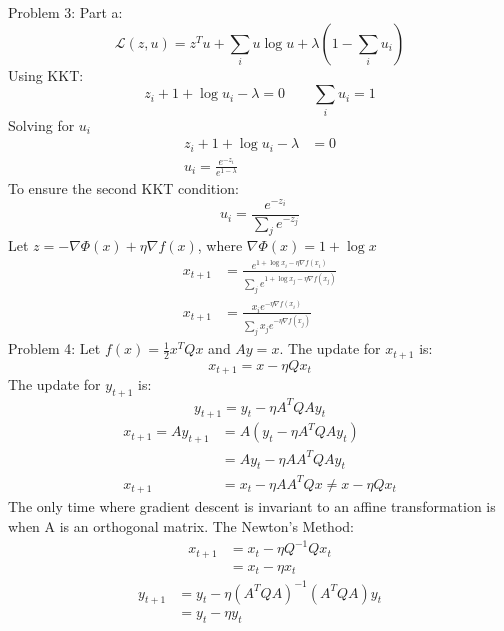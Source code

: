 \documentclass{article}
\begin{document}
\noindent
{\large Problem 3:}
\newline
Part a:
\begin{equation*}
	\mathcal{L}(z, u) = z^Tu + \sum_i {u \log u} + \lambda(1 - \sum_i u_i)
\end{equation*}
Using KKT:
\begin{equation*}
	z_i + 1 + \log u_i - \lambda = 0 \qquad
	\sum_i u_i = 1
\end{equation*}
Solving for $u_i$
\begin{align*}
	z_i + 1 + \log u_i - \lambda &= 0 \\
	u_i = \frac{e^{-z_i}}{e^{1-\lambda}}
\end{align*}
To ensure the second KKT condition:
\begin{equation*}
	u_i = \frac{e^{-z_i}}{\sum_j e^{-z_j}}
\end{equation*}
Let $ z = -\nabla \Phi(x) + \eta \nabla f(x) $, where $\nabla \Phi(x) = 1 + \log x$
\begin{align*}
	x_{t+1} &= \frac{e^{1 + \log x_i - \eta \nabla f(x_i)}}{\sum_j e^{1 + \log x_j - \eta\nabla f(x_j)}} \\
	x_{t+1} &= \frac{x_i e^{-\eta\nabla f(x_i)}}{\sum_j x_j e^{-\eta \nabla f(x_j)}}
\end{align*}
\newpage
\noindent
{\large Problem 4:}
\newline
Let $f(x) = \frac{1}{2}x^TQx$ and $ Ay = x$. 
The update for $x_{t+1}$ is:
\begin{equation*}
	x_{t+1} = x - \eta Qx_t
\end{equation*}
The update for $y_{t+1}$ is:
\begin{equation*}
	y_{t+1} = y_t - \eta A^TQAy_t
\end{equation*}
\begin{align*}
	x_{t+1} = Ay_{t+1} &= A(y_t - \eta A^TQAy_t) \\
	&= Ay_t - \eta AA^TQAy_t \\
	x_{t+1} &= x_t - \eta AA^TQx \neq x - \eta Qx_t
\end{align*}
The only time where gradient descent is invariant to an affine transformation is when A is an orthogonal matrix. \newline
The Newton's Method:
\begin{align*}
	x_{t+1} &= x_t - \eta Q^{-1}Qx_t \\
	&= x_t - \eta x_t
\end{align*}
\begin{align*}
	y_{t+1} &= y_t - \eta (A^TQA)^{-1}(A^TQA)y_t \\
	&= y_t - \eta y_t
\end{align*}
\end{document}

